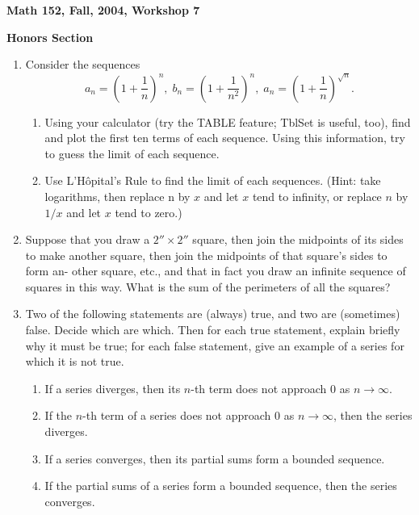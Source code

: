 \documentclass[12pt]{article}
\begin{document}
\begin{center}

{\large \bf Math 152, Fall, 2004, Workshop 7\par}
\vspace{.5cm}
{{\bf Honors Section} 
\par}
\end{center}

\begin{enumerate}

\item Consider the sequences 
$${\displaystyle
a_{n} =\left(1+\frac{1}{n}\right)^{n}}, \;
{\displaystyle
b_{n} =\left(1+\frac{1}{n^{2}}\right)^{n}}, \;
{\displaystyle
a_{n} =\left(1+\frac{1}{n}\right)^{\sqrt{n}}}.$$

\begin{enumerate}

\item Using your calculator (try the TABLE feature; TblSet is useful, 
too), find and plot the 
first ten terms of each sequence. Using this information, 
try to guess the limit of each 
sequence. 

\item Use L'H\^{o}pital's Rule to find the limit of each sequences. 
(Hint: take logarithms, then 
replace n by $x$ and let $x$ tend to infinity, or 
replace $n$ by $1/x$ and let $x$ tend to zero.) 

\end{enumerate}

\item Suppose that you draw a $2''\times 2''$ square, then join 
the midpoints of its sides to make another square, then 
join the midpoints of that square's sides to form an- 
other square, etc., and that in fact you draw an infinite 
sequence of squares in this way. What is the sum of the 
perimeters of all the squares? 

\vspace{13em}

\item Two of the following statements are (always) true, and two are
(sometimes) false. Decide which are which. Then for each true statement,
explain briefly why it must be true; for each false statement, give an
example of a series for which it is not true. 

\begin{enumerate}

\item If a series diverges, then its $n$-th term does not approach $0$ as 
$n\to \infty$. 

\item If the $n$-th term of a series does not approach $0$ as $n\to \infty$, 
then the series diverges. 

\item If a series converges, then its partial sums form a bounded sequence. 

\item If the partial sums of a series form a bounded sequence, 
then the series converges. 

\end{enumerate}

\end{enumerate}
\end{document}
